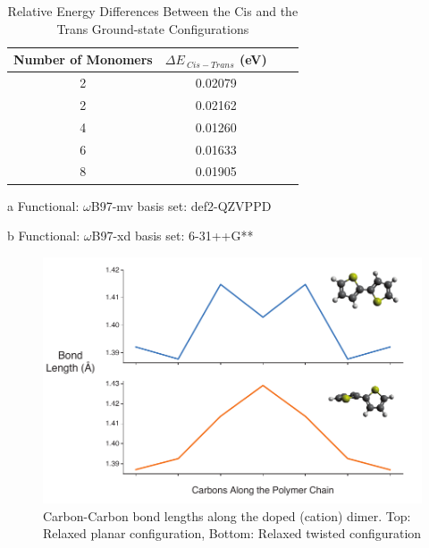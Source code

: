 \clearpage
\begin{table}[hbt!]\centering
\captionsetup{justification=centering}
\captionsetup{width=.6\textwidth}
\captionsetup{skip=2pt}
\caption{Relative Energy Differences Between the Cis and the Trans Ground-state Configurations}
\renewcommand{\arraystretch}{1.5}
\begin{threeparttable}
\begin{tabular}{cccc}\toprule
  {Number of Monomers} & {$\Delta E_{ \ Cis - Trans}$ (eV)} \\ \midrule
    2 & 0.02079\tnote{a}\\
    2 & 0.02162\tnote{b}\\
    4 & 0.01260\tnote{b}\\
    6 & 0.01633\tnote{b}\\
    8 & 0.01905\tnote{b}\\ \bottomrule
\end{tabular}
\begin{tablenotes}
\item[a] \footnotesize Functional: $\omega$B97-mv basis set: def2-QZVPPD
\item[b] \footnotesize Functional: $\omega$B97-xd basis set: 6-31++G**
\end{tablenotes}
\end{threeparttable}
\end{table}

\begin{figure}[hbt!]
    \centering
    \includegraphics{figures/append_tor_model/n2_fig_w.pdf}
    \caption[Polaron Localization in PT Chain (N = 2)]{Carbon-Carbon bond lengths along the doped (cation) dimer. Top: Relaxed planar configuration, Bottom: Relaxed twisted configuration}
    \label{fig:n2_bl}
\end{figure}

